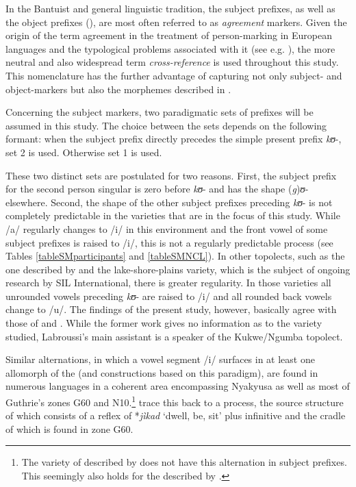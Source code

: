 In the Bantuist and general linguistic tradition, the subject prefixes, as well as the object prefixes (), are most often referred to as \textit{agreement} markers. Given the origin of the term agreement in the treatment of person-marking in European languages and the typological problems associated with it (see e.g. \citealt{HaspelmathM2013}), the more neutral and also widespread term \textit{cross-reference} is used throughout this study. This nomenclature has the further advantage of capturing not only subject- and object-markers but also the  morphemes described in .

Concerning the subject markers, two paradigmatic sets of prefixes will be assumed in this study. The choice between the sets depends on the following formant: when the subject prefix directly precedes the simple present prefix \textit{kʊ}-, set 2 is used. Otherwise set 1 is used.

These two distinct sets are postulated for two reasons. First, the subject prefix for the second person singular is zero before  \textit{kʊ}- and has the shape (\textit{g})\textit{ʊ}- elsewhere. Second, the shape of the other subject prefixes preceding \textit{kʊ}- is not completely predictable in the varieties that are in the focus of this study. While /a/ regularly changes to /i/ in this environment and the front vowel of some subject prefixes is raised to /i/, this is not a regularly predictable process (see Tables \ref{tableSMparticipants} and \ref{tableSMNCL}). In other topolects, such as the one described by \citet{BergerP1938} and the lake-shore-plains variety, which is the subject of ongoing research by SIL International, there is greater regularity. In those varieties all unrounded vowels preceding  \textit{kʊ}- are raised to /i/ and all rounded back vowels change to /u/. The findings of the present study, however, basically agree with those of \citet{MwangokaNVoorhoeveJ1960b} and \citet{LabroussiC1998}. While the former work gives no information as to the variety studied, Labroussi's main assistant is a speaker of the Kukwe/Ngumba topolect.

Similar alternations, in which a vowel segment /i/ surfaces in at least one allomorph of the  (and constructions based on this paradigm), are found in numerous languages in a coherent area encompassing Nyakyusa as well as most of Guthrie's zones G60 and N10.\footnote{The variety of  described by \citet{KishindoP1999} does not have this alternation in subject prefixes. This seemingly also holds for the  described by \citet{LabroussiC1998}.} \citet{PersohnBBernanderR2016} trace this back to a  process, the source structure of which consists of a reflex of  *\textit{jìkad} \lq dwell, be, sit' plus infinitive and the cradle of which is found in zone G60. 

